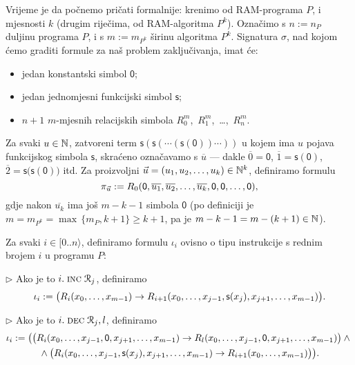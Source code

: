 Vrijeme je da počnemo pričati formalnije: krenimo od RAM-programa $P$, i mjesnosti $k$ (drugim riječima, od RAM-algoritma $P^k$). Označimo s $n:=n_P$ duljinu programa $P$, i s $m:=m_{P^k}$ širinu algoritma $P^k$. Signatura $\sigma$, nad kojom ćemo graditi formule za naš problem zaključivanja, imat će:
\begin{itemize}
    \item jedan konstantski simbol $\mathsf 0$;
    \item jedan jednomjesni funkcijski simbol $\mathsf s$;
    \item $n+1$ $m$-mjesnih relacijskih simbola $R_0^m$,~$R_1^m$,~\ldots,~$R_n^m$.
\end{itemize}

Za svaki $u\in{\mathbb N}$, zatvoreni term $\mathsf s(\mathsf s(\dotsb(\mathsf s(\mathsf0))\dotsb))$ u kojem ima $u$ pojava funkcijskog simbola $\mathsf s$, skraćeno označavamo s $\overline u$ --- dakle $\overline 0=\mathsf 0$, $\overline 1=\mathsf s(\mathsf0)$, $\overline 2=\mathsf s\bigl(\mathsf s(\mathsf0)\bigr)$ itd. Za proizvoljni $\vec u=(u_1,u_2,\dotsc,u_k)\in{\mathbb N}^k$, definiramo formulu
\begin{equation}\label{eq:defpiu}
    \pi_{\vec u}:=R_0(\mathsf0,\overline{u_1},\overline{u_2},\dotsc,\overline{u_k},\mathsf0,\mathsf0,\dotsc,\mathsf0)\text,
\end{equation}
gdje nakon $\overline{u_k}$ ima još $m-k-1$ simbola $\mathsf0$ (po definiciji je $m=m_{P^k}=\max\,\{m_P,k+1\}\ge k+1$, pa je $m-k-1=m-(k+1)\in{\mathbb N}$).

Za svaki $i\in[0..n\rangle$, definiramo formulu $\iota_i$ ovisno o tipu instrukcije s rednim brojem $i$ u programu $P$:
\smallskip

$\rhd$ Ako je to $i.\;\textsc{inc}\;\mathcal R_{j}$, definiramo
    \begin{equation}\label{eq:formINC}
        \iota_i:=\bigl(R_i(x_0,\dotsc,x_{m-1})\to R_{i+1}(x_0,\dotsc,x_{j-1},\mathsf s(x_j),x_{j+1},\dotsc,x_{m-1})\bigr)\text.
    \end{equation}

$\rhd$ Ako je to $i.\;\textsc{dec}\;\mathcal R_{j},l$, definiramo
    \begin{multline}\label{eq:formDEC}
        \iota_i:=\bigl(
        \bigl(
        R_i(x_0,\dotsc,x_{j-1},\mathsf0,x_{j+1},\dotsc,x_{m-1})\to R_l(x_0,\dotsc,x_{j-1},\mathsf0,x_{j+1},\dotsc,x_{m-1})
        \bigr)
        \land{}\\
        {}\land
        \bigl(
        R_i(x_0,\dotsc,x_{j-1},\mathsf s(x_j),x_{j+1},\dotsc,x_{m-1})\to R_{i+1}(x_0,\dotsc,x_{m-1})
        \bigr)
        \bigr)\text.
    \end{multline}

